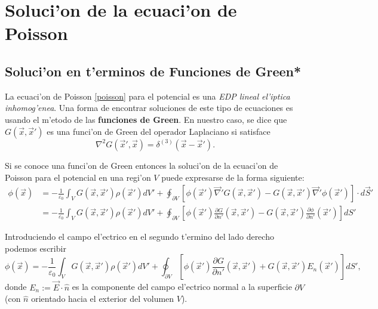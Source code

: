 

 \section{Soluci'on de la ecuaci'on de Poisson} 
 \subsection{Soluci'on en t'erminos de Funciones de Green*}
 La ecuaci'on de Poisson \eqref{poisson} para el potencial es una \textit{EDP lineal el'iptica inhomog'enea}. Una forma de encontrar soluciones de este tipo de ecuaciones es usando el m'etodo de las \textbf{funciones de Green}. En nuestro caso, se dice que $G(\vec{x},\vec{x}')$ es una funci'on de Green del operador Laplaciano si satisface
\begin{equation}\label{EDPG}
\nabla^2G(\vec{x}',\vec{x})=\delta^{(3)}(\vec{x}-\vec{x}').
\end{equation} 

Si se conoce una funci'on de Green entonces la soluci'on de la ecuaci'on de Poisson para el potencial en una regi'on $V$ puede expresarse de la forma siguiente:
\begin{align}
\phi(\vec{x}) &= -\frac{1}{\varepsilon_0}\int_VG(\vec{x},\vec{x}')\rho(\vec{x}')dV'+\oint_{\partial V}\left[\phi(\vec{x}')\vec\nabla' G(\vec{x},\vec{x}')-G(\vec{x},\vec{x}')\vec\nabla'\phi(\vec{x}')\right]\cdot d\vec{S}' \\
&=  -\frac{1}{\varepsilon_0}\int_VG(\vec{x},\vec{x}') \rho(\vec{x}')dV'+\oint_{\partial V}\left[\phi(\vec{x}')\frac{\partial G}{\partial n'}(\vec{x},\vec{x}')-G(\vec{x},\vec{x}')\frac{\partial\phi}{\partial n'}(\vec{x}')\right]dS'
\end{align}

Introduciendo el campo el'ectrico en el segundo t'ermino del lado derecho podemos escribir
\begin{equation}\label{solPoisson}
\phi(\vec{x})= -\frac{1}{\varepsilon_0}\int_VG(\vec{x},\vec{x}') \rho(\vec{x}')dV'+\oint_{\partial V}\left[\phi(\vec{x}')\frac{\partial G}{\partial n'}(\vec{x},\vec{x}')+G(\vec{x},\vec{x}')E_n(\vec{x}')\right]dS',
\end{equation}
donde $E_n:=\vec{E}\cdot\hat{n}$ es la componente del campo el'ectrico normal a la superficie $\partial V$ (con $\hat{n}$ orientado hacia el exterior del volumen $V$).

